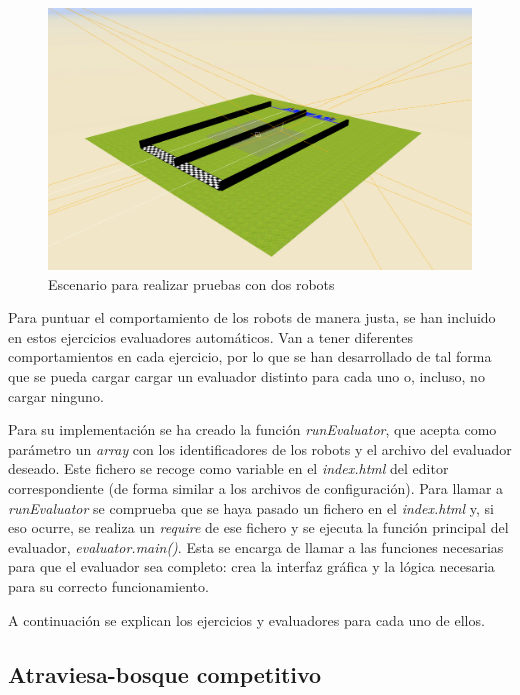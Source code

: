        \begin{figure}[H]
        \centering           
        \includegraphics[scale=0.3]{img/ejercicio_muros.png}
        \caption{Escenario para realizar pruebas con dos robots}
        \label{fig:ejercicio_muro}
    \end{figure}
    
Para puntuar el comportamiento de los robots de manera justa, se han incluido en estos ejercicios evaluadores automáticos. Van a tener diferentes comportamientos en cada ejercicio, por lo que se han desarrollado de tal forma que se pueda cargar cargar un evaluador distinto para cada uno o, incluso, no cargar ninguno. \newline

Para su implementación se ha creado la función \textit{runEvaluator}, que acepta como parámetro un \textit{array} con los identificadores de los robots y el archivo del evaluador deseado. Este fichero se recoge como variable en el \textit{index.html} del editor correspondiente (de forma similar a los archivos de configuración). 
Para llamar a \textit{runEvaluator} se comprueba que se haya pasado un fichero en el \textit{index.html} y, si eso ocurre, se realiza un \textit{require} de ese fichero y se ejecuta la función principal del evaluador, \textit{evaluator.main()}. Esta se encarga de llamar a las funciones necesarias para que el evaluador sea completo: crea la interfaz gráfica y la lógica necesaria para su correcto funcionamiento.

A continuación se explican los ejercicios y evaluadores para cada uno de ellos. 

\subsection{Atraviesa-bosque competitivo}
    
